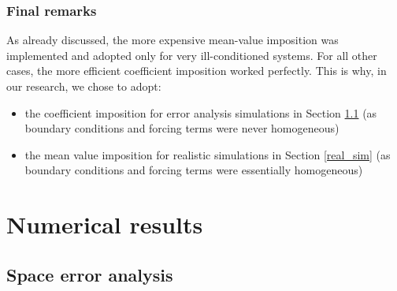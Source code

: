 \documentclass[a4paper,11pt]{article}
\begin{document}
\subsubsection{Final remarks} \label{uniqueness_results}
\noindent As already discussed, the more expensive mean-value imposition was implemented and adopted only for very ill-conditioned systems. For all other cases, the more efficient coefficient imposition worked perfectly. This is why, in our research, we chose to adopt:
\begin{itemize}
	\item the coefficient imposition for error analysis simulations in Section \ref{error_analysis} (as boundary conditions and forcing terms were never homogeneous)
	\item the mean value imposition for realistic simulations in Section \ref{real_sim} (as boundary conditions and forcing terms were essentially homogeneous)
\end{itemize}


\newpage

\captionsetup{font=normalsize}

\section{Numerical results}
\subsection{Space error analysis}\label{error_analysis}
\end{document}
